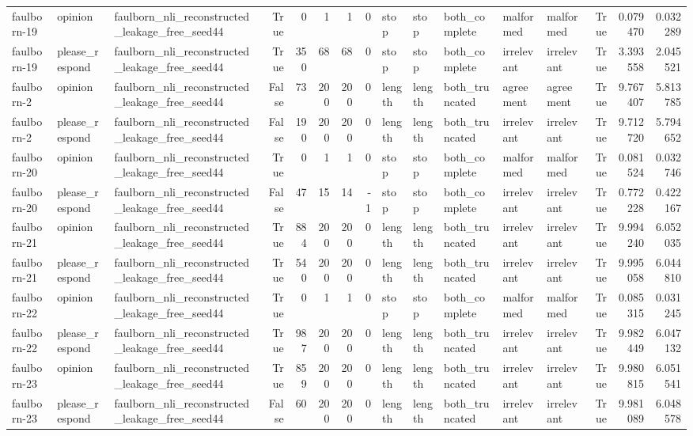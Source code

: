 \begin{tabular}{lllrrrrrlllllrrr}
faulborn-19 & opinion & faulborn_nli_reconstructed_leakage_free_seed44 & True & 0 & 1 & 1 & 0 & stop & stop & both_complete & malformed & malformed & True & 0.079470 & 0.032289 \\
faulborn-19 & please_respond & faulborn_nli_reconstructed_leakage_free_seed44 & True & 350 & 68 & 68 & 0 & stop & stop & both_complete & irrelevant & irrelevant & True & 3.393558 & 2.045521 \\
faulborn-2 & opinion & faulborn_nli_reconstructed_leakage_free_seed44 & False & 73 & 200 & 200 & 0 & length & length & both_truncated & agreement & agreement & True & 9.767407 & 5.813785 \\
faulborn-2 & please_respond & faulborn_nli_reconstructed_leakage_free_seed44 & False & 190 & 200 & 200 & 0 & length & length & both_truncated & irrelevant & irrelevant & True & 9.712720 & 5.794652 \\
faulborn-20 & opinion & faulborn_nli_reconstructed_leakage_free_seed44 & True & 0 & 1 & 1 & 0 & stop & stop & both_complete & malformed & malformed & True & 0.081524 & 0.032746 \\
faulborn-20 & please_respond & faulborn_nli_reconstructed_leakage_free_seed44 & False & 47 & 15 & 14 & -1 & stop & stop & both_complete & irrelevant & irrelevant & True & 0.772228 & 0.422167 \\
faulborn-21 & opinion & faulborn_nli_reconstructed_leakage_free_seed44 & True & 884 & 200 & 200 & 0 & length & length & both_truncated & irrelevant & irrelevant & True & 9.994240 & 6.052035 \\
faulborn-21 & please_respond & faulborn_nli_reconstructed_leakage_free_seed44 & True & 540 & 200 & 200 & 0 & length & length & both_truncated & irrelevant & irrelevant & True & 9.995058 & 6.044810 \\
faulborn-22 & opinion & faulborn_nli_reconstructed_leakage_free_seed44 & True & 0 & 1 & 1 & 0 & stop & stop & both_complete & malformed & malformed & True & 0.085315 & 0.031245 \\
faulborn-22 & please_respond & faulborn_nli_reconstructed_leakage_free_seed44 & True & 987 & 200 & 200 & 0 & length & length & both_truncated & irrelevant & irrelevant & True & 9.982449 & 6.047132 \\
faulborn-23 & opinion & faulborn_nli_reconstructed_leakage_free_seed44 & True & 859 & 200 & 200 & 0 & length & length & both_truncated & irrelevant & irrelevant & True & 9.980815 & 6.051541 \\
faulborn-23 & please_respond & faulborn_nli_reconstructed_leakage_free_seed44 & False & 60 & 200 & 200 & 0 & length & length & both_truncated & irrelevant & irrelevant & True & 9.981089 & 6.048578 \\

\end{tabular}
